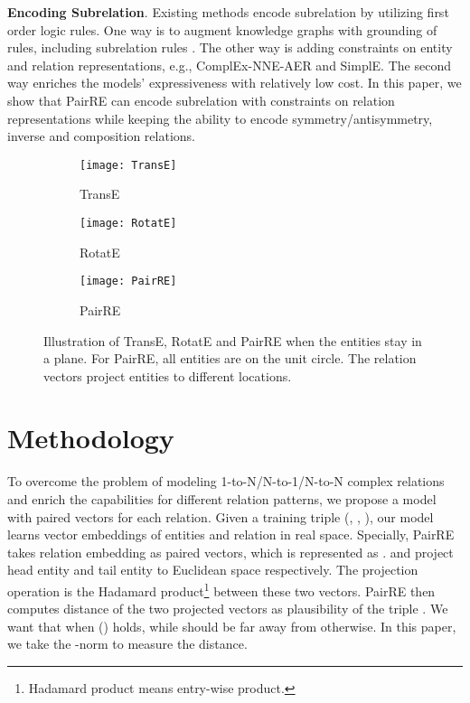 \documentclass[11pt,a4paper]{article}
\begin{document}
\textbf{Encoding Subrelation}.
Existing methods encode subrelation by utilizing first order logic rules.
One way is to augment knowledge graphs with grounding of rules, including subrelation rules \cite{guo2018knowledge, qu2019probabilistic}.
The other way is adding constraints on entity and relation representations, e.g., ComplEx-NNE-AER and SimplE.
The second way enriches the models' expressiveness with relatively low cost. In this paper, we show that PairRE can  encode subrelation with constraints on relation representations while keeping the ability to encode symmetry/antisymmetry, inverse and composition relations.

\begin{figure*}[h]
   \begin{subfigure}{.33\textwidth}
    \centering
    \texttt{[image: TransE]}
    \caption{TransE}
    \label{fig:transe}
  \end{subfigure}
  \begin{subfigure}{.33\textwidth}
    \centering
    \texttt{[image: RotatE]}
    \caption{RotatE}
    \label{fig:rotate}
  \end{subfigure}
  \begin{subfigure}{.33\textwidth}
    \centering
    \texttt{[image: PairRE]}
    \caption{PairRE}
    \label{fig:pairre}
  \end{subfigure}
\caption{Illustration of TransE, RotatE and PairRE when the entities stay in a plane.
For PairRE, all entities are on the unit circle.
The relation vectors project entities to different locations.
}
\label{fig:Illustration}
\end{figure*}

\section{Methodology}\label{Method}

To overcome the problem of modeling 1-to-N/N-to-1/N-to-N complex relations and enrich the capabilities for different relation patterns, we propose a model with paired vectors for each relation.
Given a training triple (, , ), our model learns vector embeddings of entities and relation in real space.
Specially, PairRE takes relation embedding as paired vectors, which is represented as .
 and  project head entity  and tail entity  to Euclidean space respectively.
The projection operation is the Hadamard product\footnote{Hadamard product means entry-wise product.} between these two vectors.
PairRE then computes distance of the two projected vectors as plausibility of the triple .
We want that  when () holds, while  should be far away from  otherwise.
In this paper, we take the -norm to measure the distance.
\end{document}
